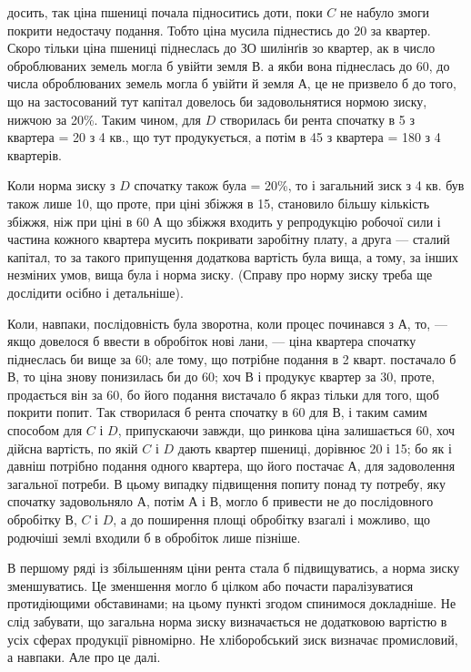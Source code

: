 \parcont{}  %
досить, так ціна пшениці почала підноситись доти, поки $C$ не набуло змоги
покрити недостачу подання. Тобто ціна мусила піднестись до 20 за
квартер. Скоро тільки ціна пшениці піднеслась до ЗО шилінґів зо квартер, ак
в число оброблюваних земель могла б увійти земля В. а якби вона піднеслась
до 60, до числа оброблюваних земель могла б увійти й земля А, це
не призвело б до того, що на застосований тут капітал довелось би задовольнятися
нормою зиску, нижчою за 20\%. Таким чином, для $D$ створилась би
рента спочатку в 5 з квартера = 20 з 4 кв., що тут продукується,
а потім в 45 з квартера = 180 з 4 квартерів.

Коли норма зиску з $D$ спочатку також була = 20\%, то і загальний зиск
з 4 кв. був також лише 10, що проте, при ціні збіжжя в 15, становило
більшу кількість збіжжя, ніж при ціні в 60 А що збіжжя входить
у репродукцію робочої сили і частина кожного квартера мусить покривати заробітну
плату, а друга — сталий капітал, то за такого припущення додаткова
вартість була вища, а тому, за інших незміних умов, вища була і норма зиску.
(Справу про норму зиску треба ще дослідити осібно і детальніше).

Коли, навпаки, послідовність була зворотна, коли процес починався з $А$,
то, — якщо довелося б ввести в обробіток нові лани, — ціна квартера спочатку
піднеслась би вище за 60; але тому, що потрібне подання в 2 кварт. постачало
б $В$, то ціна знову понизилась би до 60; хоч $В$ і продукує квартер
за 30, проте, продається він за 60, бо його подання вистачало б
якраз тільки для того, щоб покрити попит. Так створилася б рента спочатку в
60 для $В$, і таким самим способом для $C$ і $D$, припускаючи завжди, що
ринкова ціна залишається 60, хоч дійсна вартість, по якій $C$ і $D$ дають
квартер пшениці, дорівнює 20 і 15; бо як і давніш потрібно подання одного
квартера, що його постачає $А$, для задоволення загальної потреби. В цьому випадку
підвищення попиту понад ту потребу, яку спочатку задовольняло $А$, потім
$А$ і $В$, могло б привести не до послідовного обробітку $В$, $C$ і $D$, а до поширення
площі обробітку взагалі і можливо, що родючіші землі входили б в обробіток
лише пізніше.

В першому ряді із збільшенням ціни рента стала б підвищуватись, а норма
зиску зменшуватись. Це зменшення могло б цілком або почасти паралізуватися
протидіющими обставинами; на цьому пункті згодом спинимося докладніше.
Не слід забувати, що загальна норма зиску визначається не додатковою вартістю
в усіх сферах продукції рівномірно. Не хліборобський зиск визначає промисловий,
а навпаки. Але про це далі.

